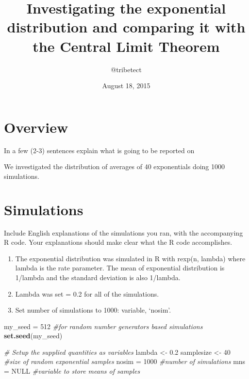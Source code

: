 \documentclass[]{article}
\title{Investigating the exponential distribution and comparing it with the
Central Limit Theorem}
\author{@tribetect}
\date{August 18, 2015}
\newenvironment{Shaded}{\begin{snugshade}}{\end{snugshade}}
\newcommand{\KeywordTok}[1]{\textcolor[rgb]{0.13,0.29,0.53}{\textbf{{#1}}}}
\newcommand{\DecValTok}[1]{\textcolor[rgb]{0.00,0.00,0.81}{{#1}}}
\newcommand{\FloatTok}[1]{\textcolor[rgb]{0.00,0.00,0.81}{{#1}}}
\newcommand{\StringTok}[1]{\textcolor[rgb]{0.31,0.60,0.02}{{#1}}}
\newcommand{\CommentTok}[1]{\textcolor[rgb]{0.56,0.35,0.01}{\textit{{#1}}}}
\newcommand{\OtherTok}[1]{\textcolor[rgb]{0.56,0.35,0.01}{{#1}}}
\newcommand{\NormalTok}[1]{{#1}}
\begin{document}
\maketitle


\section{Overview}\label{overview}

In a few (2-3) sentences explain what is going to be reported on

We investigated the distribution of averages of 40 exponentials doing
1000 simulations.

\section{Simulations}\label{simulations}

Include English explanations of the simulations you ran, with the
accompanying R code. Your explanations should make clear what the R code
accomplishes.

\begin{enumerate}
\def\labelenumi{\arabic{enumi}.}
\itemsep1pt\parskip0pt
\item
  The exponential distribution was simulated in R with rexp(n, lambda)
  where lambda is the rate parameter. The mean of exponential
  distribution is 1/lambda and the standard deviation is also 1/lambda.
\item
  Lambda was set = 0.2 for all of the simulations.
\item
  Set number of simulations to 1000: variable, `nosim'.
\end{enumerate}

\begin{Shaded}
\begin{Highlighting}[]
\NormalTok{my_seed =}\StringTok{ }\DecValTok{512} \CommentTok{#for random number generators based simulations}
\KeywordTok{set.seed}\NormalTok{(my_seed) }

\CommentTok{# Setup the supplied quantities as variables}
\NormalTok{lambda <-}\StringTok{ }\FloatTok{0.2}
\NormalTok{samplesize <-}\StringTok{ }\DecValTok{40} \CommentTok{#size of random exponential samples }
\NormalTok{nosim =}\StringTok{ }\DecValTok{1000} \CommentTok{#number of simulations}
\NormalTok{mns =}\StringTok{ }\OtherTok{NULL} \CommentTok{#variable to store means of samples}
\end{Highlighting}
\end{Shaded}
\end{document}
